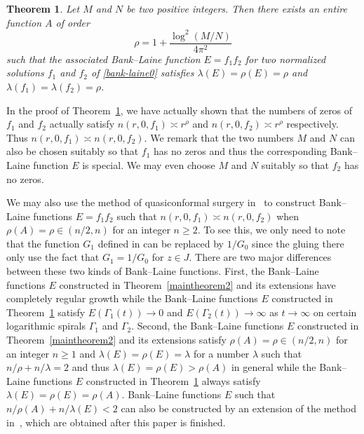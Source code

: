 \documentclass[12pt]{amsart}
\numberwithin{equation}{section}
\newtheorem{theorem}{Theorem}[section]
\begin{document}
\begin{theorem}\label{maintheorem3}
Let $M$ and $N$ be two positive integers. Then there exists an entire function $A$ of order
\begin{equation*}%
\rho=1+\frac{\log^2(M/N)}{4\pi^2}
\end{equation*}
such that the associated Bank--Laine function $E=f_1f_2$ for two normalized solutions $f_1$ and $f_2$ of \eqref{bank-laine0} satisfies $\lambda(E)=\rho(E)=\rho$ and $\lambda(f_1)=\lambda(f_2)=\rho$.
\end{theorem}

In the proof of Theorem~\ref{maintheorem3}, we have actually shown that the numbers of zeros of $f_1$ and $f_2$ actually satisfy $n(r,0,f_1) \asymp r^{\rho}$ and $n(r,0,f_2) \asymp r^{\rho}$ respectively. Thus $n(r,0,f_1)\asymp n(r,0,f_2)$. We remark that the two numbers $M$ and $N$ can also be chosen suitably so that $f_1$ has no zeros and thus the corresponding Bank--Laine function $E$ is special. We may even choose $M$ and $N$ suitably so that $f_2$ has no zeros.

We may also use the method of quasiconformal surgery in~\cite{Bergweilereremenko2019,Zhang2024} to construct Bank--Laine functions $E=f_1f_2$ such that $n(r,0,f_1)\asymp n(r,0,f_2)$ when $\rho(A)=\rho\in(n/2,n)$ for an integer $n\geq 2$. To see this, we only need to note that the function $G_1$ defined in \cite[Section~5]{Bergweilereremenko2019} can be replaced by $1/G_0$ since the gluing there only use the fact that $G_1=1/G_0$ for $z\in J$. There are two major differences between these two kinds of Bank--Laine functions. First, the Bank--Laine functions $E$ constructed in Theorem~\ref{maintheorem2} and its extensions have completely regular growth while the Bank--Laine functions $E$ constructed in Theorem~\ref{maintheorem3} satisfy $E(\Gamma_1(t))\to 0$ and $E(\Gamma_2(t))\to\infty$ as $t\to\infty$ on certain logarithmic spirals $\Gamma_1$ and $\Gamma_2$. Second, the Bank--Laine functions $E$ constructed in Theorem~\ref{maintheorem2} and its extensions satisfy $\rho(A)=\rho\in(n/2,n)$ for an integer $n\geq 1$ and $\lambda(E)=\rho(E)=\lambda$ for a number $\lambda$ such that $n/\rho+n/\lambda=2$ and thus $\lambda(E)=\rho(E)>\rho(A)$ in general while the Bank--Laine functions $E$ constructed in Theorem~\ref{maintheorem3} always satisfy $\lambda(E)=\rho(E)=\rho(A)$. Bank--Laine functions $E$ such that $n/\rho(A)+n/\lambda(E)<2$ can also be constructed by an extension of the method in~\cite{Bergweilereremenko2019}, which are obtained after this paper is finished.
\end{document}
